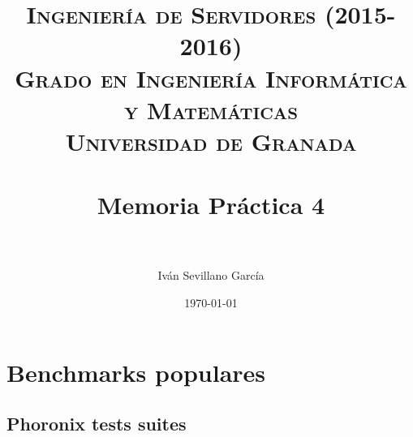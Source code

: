 

\title{	
	\normalfont \normalsize 
	\textsc{{\bf Ingeniería de Servidores (2015-2016)} \\ Grado en Ingeniería Informática y Matemáticas \\ Universidad de Granada} \\ [25pt] %
	\horrule{0.5pt} \\[0.4cm] %
	\huge Memoria Práctica 4 \\ %
	\horrule{2pt} \\[0.5cm] %
}

\author{Iván Sevillano García} %

\date{\normalsize\today} %



\maketitle %

\newpage %

\tableofcontents %

\newpage

\section{Benchmarks populares}

\subsection{Phoronix tests suites}

